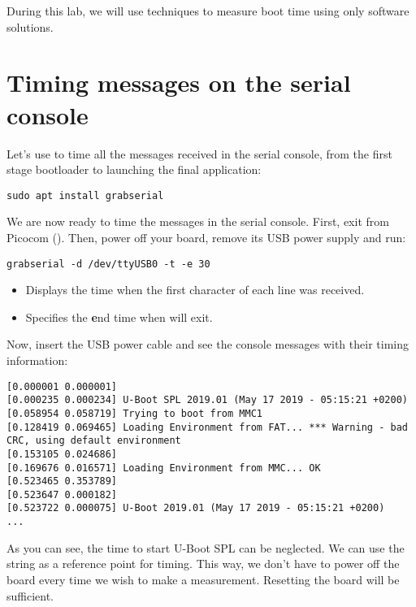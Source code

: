 
During this lab, we will use techniques to measure boot time using only
software solutions.

\section{Timing messages on the serial console}

Let's use  to time all the messages received in the
serial console, from the first stage bootloader to launching the final
application:

\begin{verbatim}
sudo apt install grabserial
\end{verbatim}

We are now ready to time the messages in the serial console. First, exit
from Picocom (\code{[Ctrl][a] [Ctrl][x]}). Then, power off your board,
remove its USB power supply and run:

\begin{verbatim}
grabserial -d /dev/ttyUSB0 -t -e 30
\end{verbatim}

\begin{itemize}
\item {} Displays the time when the first character of each line
was received.
\item {} Specifies the {\bf e}nd time when 
will exit.
\end{itemize}

Now, insert the USB power cable and see the console messages with their
timing information:

\begin{verbatim}
[0.000001 0.000001]
[0.000235 0.000234] U-Boot SPL 2019.01 (May 17 2019 - 05:15:21 +0200)
[0.058954 0.058719] Trying to boot from MMC1
[0.128419 0.069465] Loading Environment from FAT... *** Warning - bad CRC, using default environment
[0.153105 0.024686]
[0.169676 0.016571] Loading Environment from MMC... OK
[0.523465 0.353789]
[0.523647 0.000182]
[0.523722 0.000075] U-Boot 2019.01 (May 17 2019 - 05:15:21 +0200)
...
\end{verbatim}

As you can see, the time to start U-Boot SPL can be neglected. We can
use the  string as a reference point for timing. This way,
we don't have to power off the board every time we wish to make a
measurement. Resetting the board will be sufficient.

